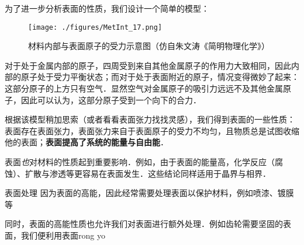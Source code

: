 为了进一步分析表面的性质，我们设计一个简单的模型：
\begin{figure}[ht]
\centering
\texttt{[image: ./figures/MetInt\_17.png]}
\caption{材料内部与表面原子的受力示意图（仿自朱文涛《简明物理化学》）} \label{MetInt_fig17}
\end{figure}
对于处于金属内部的原子，四周受到来自其他金属原子的作用力大致相同，因此内部的原子处于受力平衡状态；而对于处于表面附近的原子，情况变得微妙了起来：这部分原子的上方只有空气．显然空气对金属原子的吸引力远远不及其他金属原子，因此可以认为，这部分原子受到一个向下的合力．

根据该模型稍加思索（或者看看表面张力找找灵感），我们得到表面的一些性质：表面存在表面张力，表面张力来自于表面原子的受力不均匀，且物质总是试图收缩他的表面；\textbf{表面提高了系统的能量与自由能}．

表面\textsl{也}对材料的性质起到重要影响．例如，由于表面的能量高，化学反应（腐蚀）、扩散与渗透等更容易在表面发生．这些结论同样适用于晶界与相界．

\begin{example}{表面处理}
因为表面的高能，因此经常需要处理表面以保护材料，例如喷漆、镀膜等

同时，表面的高能性质也允许我们对表面进行额外处理．例如齿轮需要坚固的表面，我们便利用表面rong yo
\end{example}

